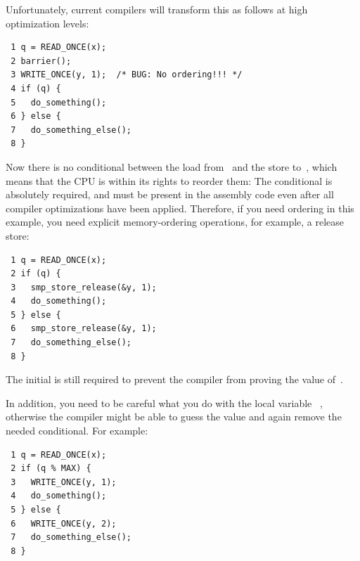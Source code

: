 Unfortunately, current compilers will transform this as follows at high
optimization levels:

\vspace{5pt}
\begin{minipage}[t]{\columnwidth}
\scriptsize
\begin{verbatim}
 1 q = READ_ONCE(x);
 2 barrier();
 3 WRITE_ONCE(y, 1);  /* BUG: No ordering!!! */
 4 if (q) {
 5   do_something();
 6 } else {
 7   do_something_else();
 8 }
\end{verbatim}
\end{minipage}
\vspace{5pt}

Now there is no conditional between the load from~ and the store
to~, which means that the CPU is within its rights to reorder them:
The conditional is absolutely required, and must be present in the
assembly code even after all compiler optimizations have been applied.
Therefore, if you need ordering in this example, you need explicit
memory-ordering operations, for example, a release store:

\vspace{5pt}
\begin{minipage}[t]{\columnwidth}
\scriptsize
\begin{verbatim}
 1 q = READ_ONCE(x);
 2 if (q) {
 3   smp_store_release(&y, 1);
 4   do_something();
 5 } else {
 6   smp_store_release(&y, 1);
 7   do_something_else();
 8 }
\end{verbatim}
\end{minipage}
\vspace{5pt}

The initial  is still required to prevent the compiler from
proving the value of~.

In addition, you need to be careful what you do with the local variable~%
,
otherwise the compiler might be able to guess the value and again remove
the needed conditional.
For example:

\vspace{5pt}
\begin{minipage}[t]{\columnwidth}
\scriptsize
\begin{verbatim}
 1 q = READ_ONCE(x);
 2 if (q % MAX) {
 3   WRITE_ONCE(y, 1);
 4   do_something();
 5 } else {
 6   WRITE_ONCE(y, 2);
 7   do_something_else();
 8 }
\end{verbatim}
\end{minipage}
\vspace{5pt}

